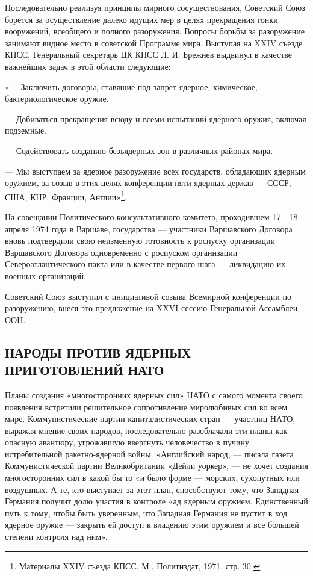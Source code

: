\documentclass[12pt, a4paper, openany]{book}
\begin{document}
	Последовательно реализуя принципы мирного сосуществования, Советский Союз борется за осуществление далеко идущих мер в целях прекращения гонки вооружений, всеобщего и полного разоружения. Вопросы борьбы за разоружение занимают видное место в советской Программе мира. Выступая на XXIV съезде КПСС, Генеральный секретарь ЦК КПСС Л. И. Брежнев выдвинул в качестве важнейших задач в этой области следующие:
	
	«— Заключить договоры, ставящие под запрет ядерное, химическое, бактериологическое оружие.
	
	— Добиваться прекращения всюду и всеми испытаний ядерного оружия, включая подземные. 
	
	— Содействовать созданию безъядерных зон в различных районах мира.
	
	— Мы выступаем за ядерное разоружение всех государств, обладающих ядерным оружием, за созыв в этих целях конференции пяти ядерных держав — СССР, США, КНР, Франции, Англии»{\footnote{Материалы XXIV съезда КПСС. М., Политиздат, 1971, стр. 30.}}.
	
	
	На совещании Политического консультативного комитета, проходившем 17—18 апреля 1974 года в Варшаве, государства — участники Варшавского Договора вновь подтвердили свою неизменную готовность к роспуску организации Варшавского Договора одновременно с роспуском организации Североатлантического пакта или в качестве первого шага — ликвидацию их военных организаций.
	
	Советский Союз выступил с инициативой созыва Всемирной конференции по разоружению, внеся это предложение на XXVI сессию Генеральной Ассамблеи ООН.
	
		\subsection[Народы против ядерных приготовлений НАТО]{\center НАРОДЫ ПРОТИВ ЯДЕРНЫХ ПРИГОТОВЛЕНИЙ НАТО}	
	
	
	Планы создания «многосторонних ядерных сил» НАТО с самого момента своего появления встретили решительное сопротивление миролюбивых сил во всем мире. Коммунистические партии капиталистических стран — участниц НАТО, выражая мнение своих народов, последовательно разоблачали эти планы как опасную авантюру, угрожавшую ввергнуть человечество в пучину истребительной ракетно-ядерной войны. «Английский народ, — писала газета Коммунистической партии Великобритании «Дейли уоркер», — не хочет создания многосторонних сил в какой бы то «и было форме — морских, сухопутных или воздушных. А те, кто выступает за этот план, способствуют тому, что Западная Германия получит долю участия в контроле «ад ядерным оружием. Единственный путь к тому, чтобы быть уверенным, что Западная Германия не пустит в ход ядерное оружие — закрыть ей доступ к владению этим оружием и все большей степени контроля над ним».
	
\end{document}
